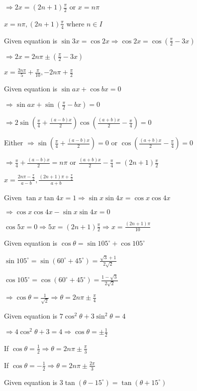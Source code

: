   $\Rightarrow 2x = (2n + 1)\frac{\pi}{2}$ or $x = n\pi$

  $x = n\pi, (2n + 1)\frac{\pi}{4}$ where $n\in I$
\item Given equation is $\sin3x = \cos2x \Rightarrow \cos2x = \cos\left(\frac{\pi}{2} - 3x\right)$

  $\Rightarrow 2x = 2n\pi \pm \left(\frac{\pi}{2} - 3x\right)$

  $x = \frac{2n\pi}{5} + \frac{\pi}{10}, -2n\pi + \frac{\pi}{2}$
\item Given equation is $\sin ax + \cos bx = 0$

  $\Rightarrow \sin ax + \sin\left(\frac{\pi}{2} - bx\right) = 0$

  $\Rightarrow 2\sin\left(\frac{\pi}{4} + \frac{(a - b)x}{2}\right)\cos\left(\frac{(a + b)x}{2} - \frac{\pi}{4}\right) = 0$

  Either $\Rightarrow \sin\left(\frac{\pi}{4} + \frac{(a - b)x}{2}\right) = 0$ or $\cos\left(\frac{(a + b)x}{2} -
  \frac{\pi}{4}\right) = 0$

  $\Rightarrow \frac{\pi}{4} + \frac{(a - b)x}{2} = n\pi$ or $\frac{(a + b)x}{2} - \frac{\pi}{4} = (2n +
  1)\frac{\pi}{2}$

  $x = \frac{2n\pi - \frac{\pi}{2}}{a - b}, \frac{(2n + 1)\pi + \frac{\pi}{2}}{a + b}$
\item Given $\tan x\tan 4x =1 \Rightarrow \sin x\sin4x = \cos x\cos4x$

  $\Rightarrow \cos x\cos4x - \sin x\sin 4x = 0$

  $\cos 5x = 0 \Rightarrow 5x = (2n + 1)\frac{\pi}{2} \Rightarrow x = \frac{(2n + 1)\pi}{10}$
\item Given equation is $\cos\theta = \sin105^\circ + \cos 105^\circ$

  $\sin105^\circ = \sin(60^\circ + 45^\circ) = \frac{\sqrt{3} + 1}{2\sqrt{2}}$

  $\cos105^\circ = \cos(60^\circ + 45^\circ) = \frac{1 - \sqrt{3}}{2\sqrt{2}}$

  $\Rightarrow \cos\theta = \frac{1}{\sqrt{2}} \Rightarrow \theta = 2n\pi \pm \frac{\pi}{4}$
\item Given equation is $7\cos^2\theta + 3\sin^2\theta = 4$

  $\Rightarrow 4\cos^2\theta + 3 = 4 \Rightarrow \cos\theta = \pm \frac{1}{2}$

  If $\cos\theta = \frac{1}{2}\Rightarrow \theta = 2n\pi\pm\frac{\pi}{3}$

  If $\cos\theta = -\frac{1}{2}\Rightarrow \theta = 2n\pi\pm\frac{2\pi}{3}$
\item Given equation is $3\tan(\theta - 15^\circ) = \tan(\theta + 15^\circ)$

